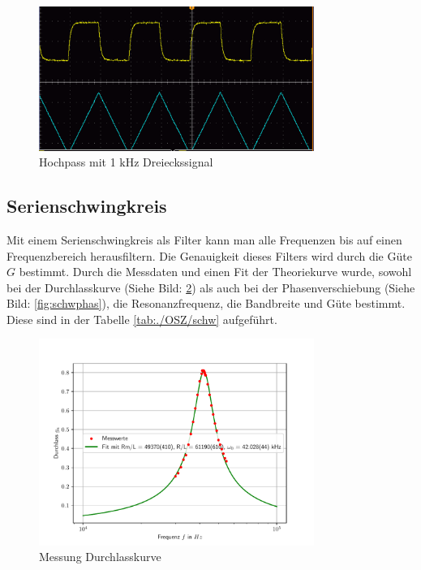 \documentclass[11pt, a4paper]{article}
\begin{document}
    \begin{figure}[h]
        \centering
        \includegraphics[width=0.8\textwidth]{Hochpass_differenzierend_tri.png}
        \caption{Hochpass mit 1 $\si{\kilo\hertz}$ Dreieckssignal}
        \label{im:Hotri}
    \end{figure}

    \subsection{Serienschwingkreis}
    Mit einem Serienschwingkreis als Filter kann man alle Frequenzen bis auf einen Frequenzbereich herausfiltern. Die Genauigkeit dieses Filters wird durch die Güte $G$ bestimmt. Durch die Messdaten und einen Fit der Theoriekurve wurde, sowohl bei der Durchlasskurve (Siehe Bild: \ref{fig:schwdur}) als auch bei der Phasenverschiebung (Siehe Bild: \ref{fig:schwphas}), die Resonanzfrequenz, die Bandbreite und Güte bestimmt. Diese sind in der Tabelle \ref{tab:./OSZ/schw} aufgeführt.
    
    

    \begin{figure}
        \centering
        \includegraphics[width=0.8\textwidth]{schwdurch.pdf}
        \caption{Messung Durchlasskurve}
        \label{fig:schwdur}
    \end{figure}
\end{document}
